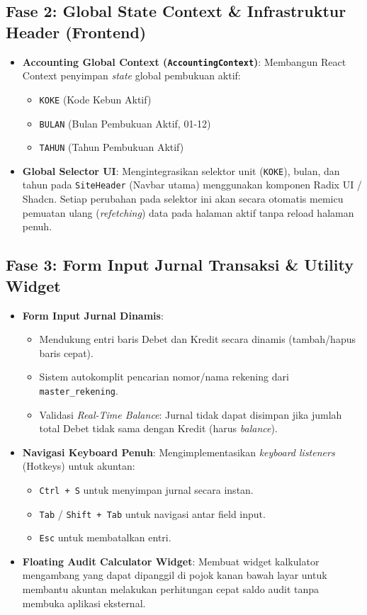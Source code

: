\documentclass[11pt,a4paper]{article}
\begin{document}
\subsection{Fase 2: Global State Context \& Infrastruktur Header (Frontend)}
\begin{itemize}
    \item \textbf{Accounting Global Context (\texttt{AccountingContext})}: Membangun React Context penyimpan \textit{state} global pembukuan aktif:
    \begin{itemize}
        \item \texttt{KOKE} (Kode Kebun Aktif)
        \item \texttt{BULAN} (Bulan Pembukuan Aktif, 01-12)
        \item \texttt{TAHUN} (Tahun Pembukuan Aktif)
    \end{itemize}
    \item \textbf{Global Selector UI}: Mengintegrasikan selektor unit (\texttt{KOKE}), bulan, dan tahun pada \texttt{SiteHeader} (Navbar utama) menggunakan komponen Radix UI / Shadcn. Setiap perubahan pada selektor ini akan secara otomatis memicu pemuatan ulang (\textit{refetching}) data pada halaman aktif tanpa reload halaman penuh.
\end{itemize}

\subsection{Fase 3: Form Input Jurnal Transaksi \& Utility Widget}
\begin{itemize}
    \item \textbf{Form Input Jurnal Dinamis}:
    \begin{itemize}
        \item Mendukung entri baris Debet dan Kredit secara dinamis (tambah/hapus baris cepat).
        \item Sistem autokomplit pencarian nomor/nama rekening dari \texttt{master\_rekening}.
        \item Validasi \textit{Real-Time Balance}: Jurnal tidak dapat disimpan jika jumlah total Debet tidak sama dengan Kredit (harus \textit{balance}).
    \end{itemize}
    \item \textbf{Navigasi Keyboard Penuh}: Mengimplementasikan \textit{keyboard listeners} (Hotkeys) untuk akuntan:
    \begin{itemize}
        \item \texttt{Ctrl + S} untuk menyimpan jurnal secara instan.
        \item \texttt{Tab} / \texttt{Shift + Tab} untuk navigasi antar field input.
        \item \texttt{Esc} untuk membatalkan entri.
    \end{itemize}
    \item \textbf{Floating Audit Calculator Widget}: Membuat widget kalkulator mengambang yang dapat dipanggil di pojok kanan bawah layar untuk membantu akuntan melakukan perhitungan cepat saldo audit tanpa membuka aplikasi eksternal.
\end{itemize}
\end{document}
